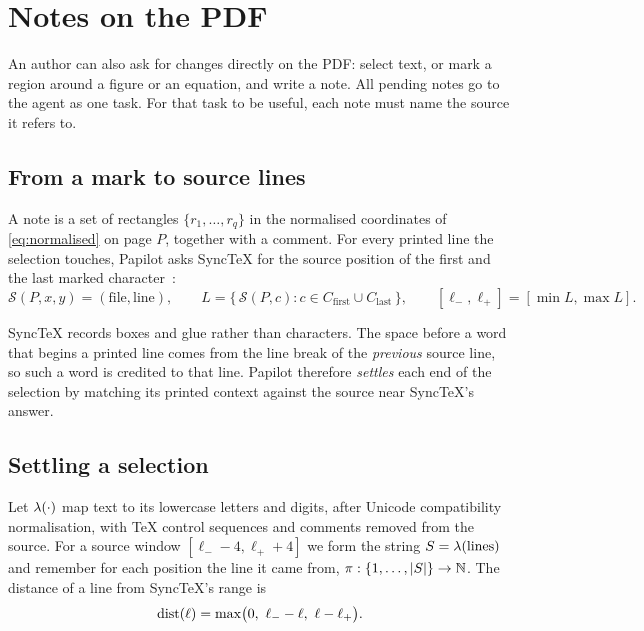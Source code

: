 \section{Notes on the PDF}
\label{sec:notes}

An author can also ask for changes directly on the PDF: select text, or mark a
region around a figure or an equation, and write a note. All pending notes go
to the agent as one task. For that task to be useful, each note must name the
source it refers to.

\subsection{From a mark to source lines}

A note is a set of rectangles $\{r_1, \dots, r_q\}$ in the normalised
coordinates of \cref{eq:normalised} on page $P$, together with a comment. For
every printed line the selection touches, Papilot asks SyncTeX for the source
position of the first and the last marked character~\cite{laurens2008}:
\begin{equation}
  \mathcal{S}(P, x, y) = (\text{file}, \text{line}),
  \qquad
  L = \{\, \mathcal{S}(P, c) : c \in C_{\text{first}} \cup C_{\text{last}} \,\},
  \qquad
  [\ell_{-}, \ell_{+}] = [\min L, \max L].
  \label{eq:synctex-range}
\end{equation}

SyncTeX records boxes and glue rather than characters. The space before a word
that begins a printed line comes from the line break of the \emph{previous}
source line, so such a word is credited to that line. Papilot therefore
\emph{settles} each end of the selection by matching its printed context
against the source near SyncTeX's answer.

\subsection{Settling a selection}

Let $\lambda(\cdot)$ map text to its lowercase letters and digits, after
Unicode compatibility normalisation, with \TeX{} control sequences and comments
removed from the source. For a source window $[\ell_{-} - 4, \ell_{+} + 4]$ we
form the string $S = \lambda(\text{lines})$ and remember for each position the
line it came from, $\pi : \{1, \dots, \lvert S\rvert\} \to \mathbb{N}$. The distance of a
line from SyncTeX's range is
\begin{equation}
  \dist(\ell) = \max\bigl(0,\ \ell_{-} - \ell,\ \ell - \ell_{+}\bigr).
  \label{eq:line-distance}
\end{equation}


